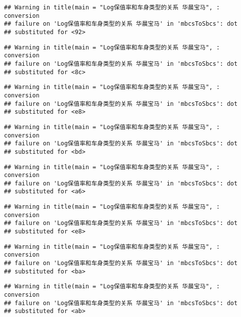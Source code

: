 \documentclass[]{article}
\begin{document}
\begin{verbatim}
## Warning in title(main = "Log保值率和车身类型的关系 华晨宝马", : conversion
## failure on 'Log保值率和车身类型的关系 华晨宝马' in 'mbcsToSbcs': dot
## substituted for <92>
\end{verbatim}

\begin{verbatim}
## Warning in title(main = "Log保值率和车身类型的关系 华晨宝马", : conversion
## failure on 'Log保值率和车身类型的关系 华晨宝马' in 'mbcsToSbcs': dot
## substituted for <8c>
\end{verbatim}

\begin{verbatim}
## Warning in title(main = "Log保值率和车身类型的关系 华晨宝马", : conversion
## failure on 'Log保值率和车身类型的关系 华晨宝马' in 'mbcsToSbcs': dot
## substituted for <e8>
\end{verbatim}

\begin{verbatim}
## Warning in title(main = "Log保值率和车身类型的关系 华晨宝马", : conversion
## failure on 'Log保值率和车身类型的关系 华晨宝马' in 'mbcsToSbcs': dot
## substituted for <bd>
\end{verbatim}

\begin{verbatim}
## Warning in title(main = "Log保值率和车身类型的关系 华晨宝马", : conversion
## failure on 'Log保值率和车身类型的关系 华晨宝马' in 'mbcsToSbcs': dot
## substituted for <a6>
\end{verbatim}

\begin{verbatim}
## Warning in title(main = "Log保值率和车身类型的关系 华晨宝马", : conversion
## failure on 'Log保值率和车身类型的关系 华晨宝马' in 'mbcsToSbcs': dot
## substituted for <e8>
\end{verbatim}

\begin{verbatim}
## Warning in title(main = "Log保值率和车身类型的关系 华晨宝马", : conversion
## failure on 'Log保值率和车身类型的关系 华晨宝马' in 'mbcsToSbcs': dot
## substituted for <ba>
\end{verbatim}

\begin{verbatim}
## Warning in title(main = "Log保值率和车身类型的关系 华晨宝马", : conversion
## failure on 'Log保值率和车身类型的关系 华晨宝马' in 'mbcsToSbcs': dot
## substituted for <ab>
\end{verbatim}
\end{document}
